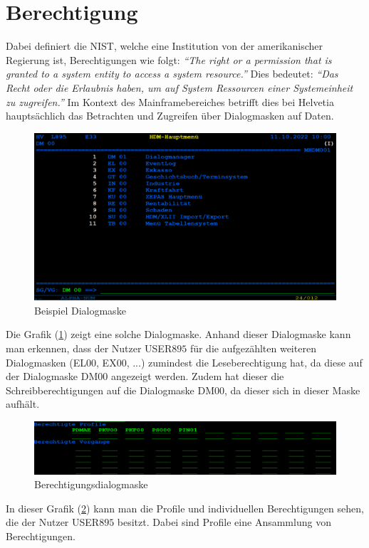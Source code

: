 \section{Berechtigung}
\label{sec:Berechtigung}
Dabei definiert die \ac{NIST}, welche eine Institution von der amerikanischer Regierung ist, Berechtigungen wie folgt:
\newline
\newline
\textit{"`The right or a permission that is granted to a system entity to access a system resource."'} \cite{Auth}
\newline
\newline
Dies bedeutet:
\newline
\newline
\textit{"`Das Recht oder die Erlaubnis haben, um auf System Ressourcen einer Systemeinheit zu zugreifen."'} \cite{Mainframe}
\newline
\newline
Im Kontext des Mainframebereiches betrifft dies bei Helvetia hauptsächlich das Betrachten und Zugreifen über Dialogmasken auf Daten.
\begin{figure}[h!]
 \centering
 \includegraphics[width=1\textwidth]{gfx/Picture/Dialog.PNG}
 \caption{Beispiel Dialogmaske}
 \label{fig:Dial}
\end{figure}
Die Grafik (\ref{fig:Dial}) zeigt eine solche Dialogmaske.
Anhand dieser Dialogmaske kann man erkennen, dass der Nutzer USER$895$ für die aufgezählten weiteren Dialogmasken (EL$00$, EX$00$, ...) zumindest die Leseberechtigung hat, da diese auf der Dialogmaske DM$00$ angezeigt werden.
Zudem hat dieser die Schreibberechtigungen auf die Dialogmaske DM$00$, da dieser sich in dieser Maske aufhält. 
\newline
\newline
\begin{figure}[h!]
 \centering
 \includegraphics[width=1\textwidth]{gfx/Picture/Berechtigung.PNG}
 \caption{Berechtigungsdialogmaske}
 \label{fig:Berch}
\end{figure}
In dieser Grafik (\ref{fig:Berch}) kann man die Profile und individuellen Berechtigungen sehen, die der Nutzer USER$895$ besitzt.
Dabei sind Profile eine Ansammlung von Berechtigungen.

